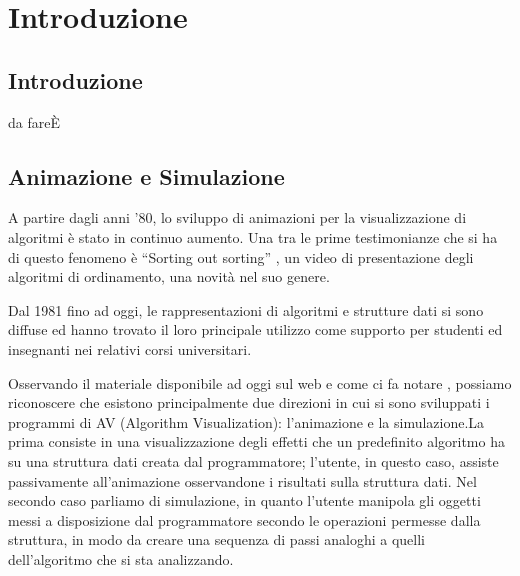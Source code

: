 
\chapter{Introduzione}\label{capitolo1}


\section{Introduzione}

da fareÈ


\section{Animazione e Simulazione}

A partire dagli anni '80, lo sviluppo di animazioni per la visualizzazione
di algoritmi è stato in continuo aumento. Una tra le prime testimonianze
che si ha di questo fenomeno è {}``Sorting out sorting'' \cite{video},
un video di presentazione degli algoritmi di ordinamento, una novità
nel suo genere.

Dal 1981 fino ad oggi, le rappresentazioni di algoritmi e strutture
dati si sono diffuse ed hanno trovato il loro principale utilizzo
come supporto per studenti ed insegnanti nei relativi corsi universitari.

Osservando il materiale disponibile ad oggi sul web e come ci fa notare
\cite{MatrixPro}, possiamo riconoscere che esistono principalmente
due direzioni in cui si sono sviluppati i programmi di AV (Algorithm
Visualization): l'animazione e la simulazione.La prima consiste in
una visualizzazione degli effetti che un predefinito algoritmo ha
su una struttura dati creata dal programmatore; l'utente, in questo
caso, assiste passivamente all'animazione osservandone i risultati
sulla struttura dati. Nel secondo caso parliamo di simulazione, in
quanto l'utente manipola gli oggetti messi a disposizione dal programmatore
secondo le operazioni permesse dalla struttura, in modo da creare
una sequenza di passi analoghi a quelli dell'algoritmo che si sta
analizzando.

